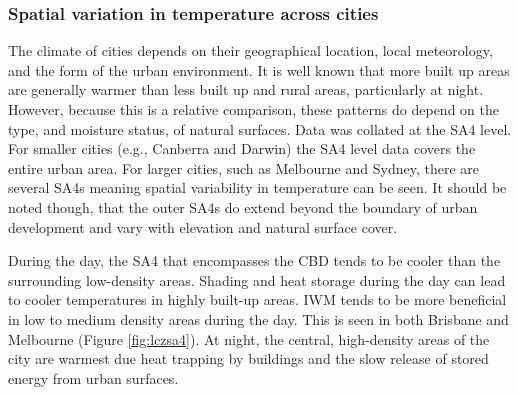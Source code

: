 \documentclass[final,3p,times,authoryear]{elsarticle}
\begin{document}
\subsubsection{Spatial variation in temperature across cities}\label{sec:results1a}

The climate of cities depends on their geographical location, local meteorology, and the form of the urban environment. It is well known that more built up areas are generally warmer than less built up and rural areas, particularly at night. However, because this is a relative comparison, these patterns do depend on the type, and moisture status, of natural surfaces. Data was collated at the SA4 level. For smaller cities (e.g., Canberra and Darwin) the SA4 level data covers the entire urban area. For larger cities, such as Melbourne and Sydney, there are several SA4s meaning spatial variability in temperature can be seen. It should be noted though, that the outer SA4s do extend beyond the boundary of urban development and vary with elevation and natural surface cover.

During the day, the SA4 that encompasses the CBD tends to be cooler than the surrounding low-density areas. Shading and heat storage during the day can lead to cooler temperatures in highly built-up areas. IWM tends to be more beneficial in low to medium density areas during the day. This is seen in both Brisbane and Melbourne (Figure \ref{fig:lczsa4}). At night, the central, high-density areas of the city are warmest due heat trapping by buildings and the slow release of stored energy from urban surfaces. 
\end{document}
